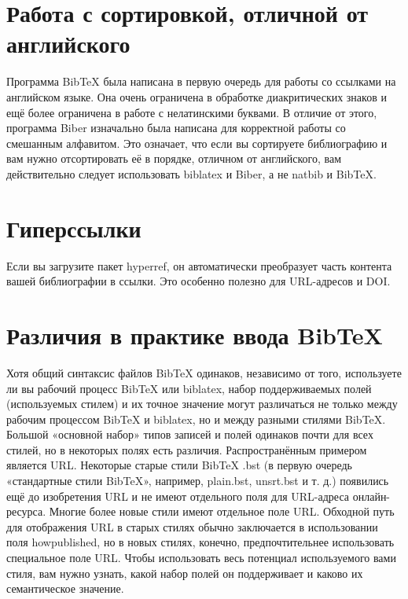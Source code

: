 \documentclass{article}
\begin{document}
  \section{Работа с сортировкой, отличной от английского}
  \label{sec:merge}
  
  Программа BibTeX была написана в первую очередь для работы со ссылками на английском языке. Она
очень ограничена в обработке диакритических знаков и ещё более ограничена в работе с нелатинскими буквами. В отличие от этого, программа Biber изначально была написана для корректной работы
со смешанным алфавитом.
Это означает, что если вы сортируете библиографию и вам нужно отсортировать её в порядке, отличном от английского, вам действительно следует использовать biblatex и Biber,
а не natbib и BibTeX.








  \section{Гиперссылки}
  \label{sec:other}


  Если вы загрузите пакет hyperref, он автоматически преобразует часть контента вашей библиографии в ссылки. Это особенно полезно для URL-адресов и DOI.






  \section{Различия в практике ввода BibTeX}
  \label{sec:ell}

  Хотя общий синтаксис файлов BibTeX одинаков, независимо от того, используете ли вы рабочий процесс BibTeX или biblatex, набор поддерживаемых полей (используемых стилем) и их точное значение могут различаться не только между рабочим процессом BibTeX и biblatex,
но и между разными стилями BibTeX. Большой «основной набор» типов записей и полей
одинаков почти для всех стилей, но в некоторых полях есть различия.
Распространённым примером является URL. Некоторые старые стили BibTeX .bst (в первую очередь «стандартные стили BibTeX», например, plain.bst, unsrt.bst и т. д.) появились ещё до изобретения URL и не имеют отдельного поля для URL-адреса онлайн-ресурса. Многие более новые
стили имеют отдельное поле URL. Обходной путь для отображения URL в старых
стилях обычно заключается в использовании поля howpublished, но в новых стилях, конечно,
предпочтительнее использовать специальное поле URL.
Чтобы использовать весь потенциал используемого вами стиля, вам нужно
узнать, какой набор полей он поддерживает и каково их семантическое значение.
\end{document}
